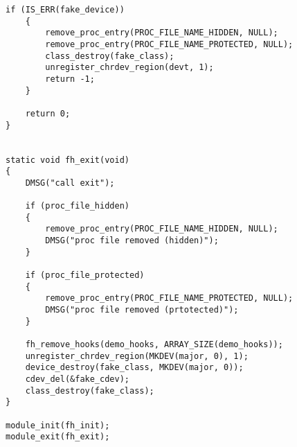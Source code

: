 \begin{lstlisting}[label=code:main,caption=Файл main.c]
	if (IS_ERR(fake_device))
	{
		remove_proc_entry(PROC_FILE_NAME_HIDDEN, NULL);
		remove_proc_entry(PROC_FILE_NAME_PROTECTED, NULL);
		class_destroy(fake_class);
		unregister_chrdev_region(devt, 1);
		return -1;
	}
	
	return 0;
}


static void fh_exit(void)
{
	DMSG("call exit");
	
	if (proc_file_hidden) 
	{
		remove_proc_entry(PROC_FILE_NAME_HIDDEN, NULL);
		DMSG("proc file removed (hidden)");
	}
	
	if (proc_file_protected) 
	{
		remove_proc_entry(PROC_FILE_NAME_PROTECTED, NULL);
		DMSG("proc file removed (prtotected)");
	}
	
	fh_remove_hooks(demo_hooks, ARRAY_SIZE(demo_hooks));
	unregister_chrdev_region(MKDEV(major, 0), 1);
	device_destroy(fake_class, MKDEV(major, 0));
	cdev_del(&fake_cdev);
	class_destroy(fake_class);
}

module_init(fh_init);
module_exit(fh_exit);
\end{lstlisting}


